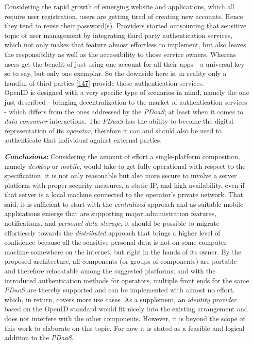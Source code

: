 \documentclass[12pt,english,a4paper,titlepage,cleardoublepage=empty,dottedtoc]{report}
\begin{document}
Considering the rapid growth of emerging website and applications, which
all require user registration, users are getting tired of creating new
accounts. Hence they tend to reuse their password(s). Providers started
outsourcing that sensitive topic of user management by integrating third
party authentication services, which not only makes that feature almost
effortless to implement, but also leaves the responsibility as well as
the accessibility to those service owners. Whereas users get the benefit
of just using one account for all their apps - a universal key so to
say, but only one exemplar. So the downside here is, in reality only a
handful of third parties
{[}\protect\hyperlink{ref-web_2009-success-of-facebook-connect}{147}{]}
provide those authentication services.\\
OpenID is designed with a very specific type of scenarios in mind,
namely the one just described - bringing decentralization to the market
of authentication services - which differs from the ones addressed by
the \emph{PDaaS}; at least when it comes to \emph{data consumer}
interactions. The \emph{PDaaS} has the ability to become the digital
representation of its \emph{operator}, therefore it can and should also
be used to authenticate that individual against external parties.

\emph{\textbf{Conclusions:}} Considering the amount of effort a
single-platform composition, namely \emph{desktop} or \emph{mobile},
would take to get fully operational with respect to the specification,
it is not only reasonable but also more secure to involve a server
platform with proper security measures, a static IP, and high
availability, even if that server is a local machine connected to the
operator's private network. That said, it is sufficient to start with
the \emph{centralized} approach and as suitable mobile applications
emerge that are supporting major administration features, notifications,
and \emph{personal data storage}, it should be possible to migrate
effortlessly towards the \emph{distributed} approach that brings a
higher level of confidence because all the sensitive personal data is
not on some computer machine somewhere on the internet, but right in the
hands of its owner. By the proposed architecture, all components (or
groups of components) are portable and therefore relocatable among the
suggested platforms; and with the introduced authentication methods for
operators, multiple front ends for the same \emph{PDaaS} are thereby
supported and can be implemented with almost no effort, which, in
return, covers more use cases. As a supplement, an \emph{identity
provider} based on the OpenID standard would fit nicely into the
existing arrangement and does not interfere with the other components.
However, it is beyond the scope of this work to elaborate on this topic.
For now it is stated as a feasible and logical addition to the
\emph{PDaaS}.
\end{document}
